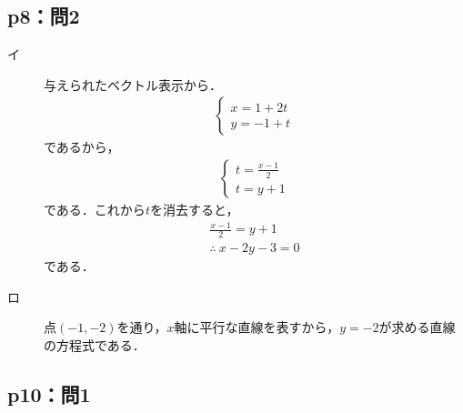 \documentclass[uplatex,dvipdfmx,a4paper,10pt,fleqn]{jsarticle}
\begin{document}
\subsection*{p8：問2}
		\begin{tleftbar}
            \begin{description}
			\item[イ]
			与えられたベクトル表示から．
			\begin{align*}
				\begin{cases}
					x=1+2t \\
					y=-1+t
				\end{cases}
			\end{align*}
			であるから，
			\begin{align*}
				\begin{cases}
					t=\frac{x-1}{2} \\
					t=y+1
				\end{cases}
			\end{align*}
			である．これから$t$を消去すると，
			\begin{gather*}
				\frac{x-1}{2} = y+1 \\
				\therefore ~ x-2y-3 =0
			\end{gather*}
			である．

			\item[ロ]
			点$(-1,-2)$を通り，$x$軸に平行な直線を表すから，$y=-2$が求める直線の方程式である．
        \end{description}
		\end{tleftbar}
%
\newpage
%
%

\subsection*{p10：問1}
\end{document}
